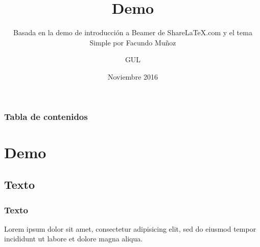 \documentclass[aspectratio=43]{beamer}
\title{Demo} %
\subtitle{Basada en la demo de introducción a Beamer de ShareLaTeX.com y el tema Simple por Facundo Muñoz} %
\author{GUL} %
\institute{\edicion Jornadas Técnicas del GUL} %
\date{Noviembre 2016} %
\begin{document}
{
    \begin{frame}
        \titlepage
    \end{frame}
}
\addtocounter{framenumber}{-1}



\begin{frame}
    \frametitle{Tabla de contenidos} %
    \tableofcontents
\end{frame}

\section{Demo}

\subsection{Texto}

\begin{frame}
    \frametitle{Texto}
    Lorem ipsum dolor sit amet, consectetur adipisicing elit, sed do eiusmod tempor incididunt ut labore et dolore magna aliqua.
\end{frame}
\end{document}
